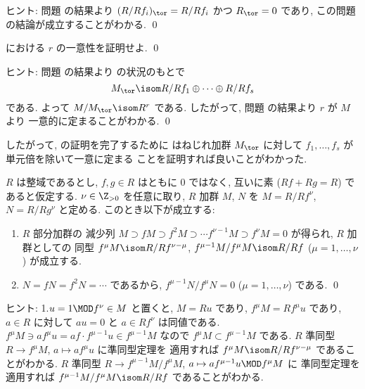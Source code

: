 \documentclass[12pt,twoside]{jarticle}
\begin{document}
\noindent
ヒント: 問題  の結果より $(R/Rf_i)_\tor = R/Rf_i$ 
かつ $R_\tor = 0$ であり, この問題の結論が成立することがわかる.
\qed


\begin{question}[$r$ の一意性]
  における $r$ の一意性を証明せよ.
  \qed
\end{question}

\noindent
ヒント: 問題  の結果より
の状況のもとで 
\begin{equation*}
  M_\tor \isom R/Rf_1\oplus\cdots\oplus R/Rf_s
\end{equation*}
である. よって $M/M_\tor\isom R^r$ である. 
したがって, 問題  の結果より $r$ が $M$ より
一意的に定まることがわかる.
\qed

\medskip

したがって, の証明を完了するために
はねじれ加群 $M_\tor$ に対して $f_1,\dots,f_s$ が単元倍を除いて一意に定まる
ことを証明すれば良いことがわかった.


\begin{question}
\label{q:M/fM}
  $R$ は整域であるとし, 
  $f,g\in R$ はともに $0$ ではなく, 互いに素 ($Rf+Rg=R$) であると仮定する.
  $\nu\in\Z_{>0}$ を任意に取り, 
  $R$ 加群 $M$, $N$ を $M=R/Rf^\nu$, $N=R/Rg^\nu$ と定める. 
  このとき以下が成立する:
  \begin{enumerate}
  \item $R$ 部分加群の
    減少列 $M\supset fM\supset f^2M\supset\cdots f^{\nu-1}M\supset f^\nu M=0$
    が得られ, $R$ 加群としての
    同型 $f^\mu M\isom R/Rf^{\nu-\mu}$, 
    $f^{\mu-1}M/f^\mu M\isom R/Rf$ ($\mu=1,\dots,\nu$) 
    が成立する.
  \item $N=fN=f^2N=\cdots$ であるから, $f^{\mu-1}N/f^\mu N=0$ 
    ($\mu=1,\dots,\nu$) である. 
    \qed
  \end{enumerate}
\end{question}

\noindent
ヒント: 1.\enspace $u=1\MOD f^\nu\in M$ と置くと, 
$M=Ru$ であり, $f^\mu M=Rf^\mu u$ 
であり, $a\in R$ に対して $au=0$ と $a\in Rf^\nu$ は同値である.
$f^\mu M\ni af^\mu u=af\cdot f^{\mu-1}u\in f^{\mu-1}M$ 
なので $f^\mu M\subset f^{\mu-1}M$ である. 
$R$ 準同型 $R\to f^\mu M$, $a\mapsto af^\mu u$ に準同型定理を
適用すれば $f^\mu M\isom R/Rf^{\nu-\mu}$ であることがわかる.
$R$ 準同型 $R\to f^{\mu-1}M/f^\mu M$, $a\mapsto af^{\mu-1}u\MOD f^\mu M$ に
準同型定理を適用すれば $f^{\mu-1}M/f^\mu M\isom R/Rf$ であることがわかる.
\end{document}
